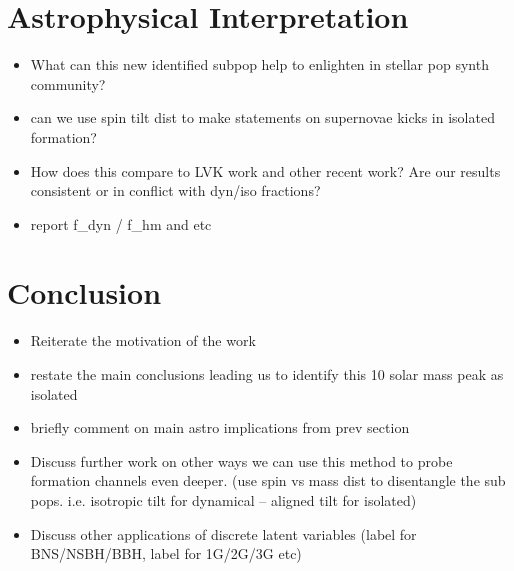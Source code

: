 \section{Astrophysical Interpretation} \label{sec:astro}

\begin{itemize}
    \item What can this new identified subpop help to enlighten in stellar pop synth community?
    \item can we use spin tilt dist to make statements on supernovae kicks in isolated formation?
    \item How does this compare to LVK work and other recent work? Are our results consistent or in conflict with dyn/iso fractions?
    \item report f_dyn / f_hm and etc
\end{itemize}

\section{Conclusion} \label{sec:conclusion}

\begin{itemize}
    \item Reiterate the motivation of the work
    \item restate the main conclusions leading us to identify this 10 solar mass peak as isolated
    \item briefly comment on main astro implications from prev section
    \item Discuss further work on other ways we can use this method to probe formation channels even deeper. (use spin vs mass dist to disentangle the sub pops. i.e. isotropic tilt for dynamical -- aligned tilt for isolated)
    \item Discuss other applications of discrete latent variables (label for BNS/NSBH/BBH, label for 1G/2G/3G etc)
\end{itemize}